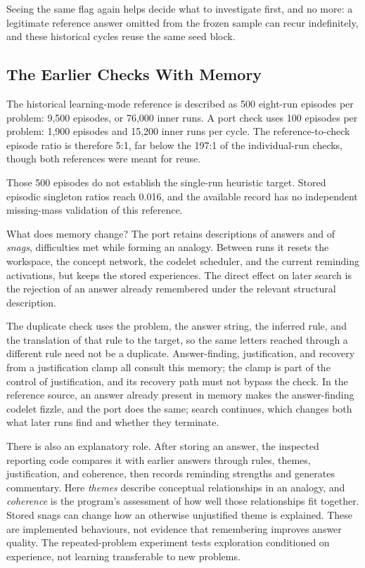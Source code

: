 \documentclass[10pt,letterpaper]{article}
\begin{document}
Seeing the same flag again helps decide what to investigate first, and no more: a
legitimate reference answer omitted from the frozen sample can recur indefinitely, and
these historical cycles reuse the same seed block.

\subsection{The Earlier Checks With Memory}\label{sec:episodic-results}

The historical learning-mode reference is described as 500 eight-run episodes per problem:
9,500 episodes, or 76,000 inner runs. A port check uses 100 episodes per problem: 1,900
episodes and 15,200 inner runs per cycle. The reference-to-check episode ratio is
therefore 5:1, far below the 197:1 of the individual-run checks, though both references
were meant for reuse.

Those 500 episodes do not establish the single-run heuristic target. Stored episodic
singleton ratios reach 0.016, and the available record has no independent missing-mass
validation of this reference.

What does memory change? The port retains descriptions of answers and of \emph{snags},
difficulties met while forming an analogy. Between runs it resets the workspace, the
concept network, the codelet scheduler, and the current reminding activations, but keeps
the stored experiences. The direct effect on later search is the rejection of an answer
already remembered under the relevant structural description.

The duplicate check uses the problem, the answer string, the inferred rule, and the
translation of that rule to the target, so the same letters reached through a different
rule need not be a duplicate. Answer-finding, justification, and recovery from a
justification clamp all consult this memory; the clamp is part of the control of
justification, and its recovery path must not bypass the check. In the reference source,
an answer already present in memory makes the answer-finding codelet fizzle, and the port
does the same; search continues, which changes both what later runs find and whether they
terminate.

There is also an explanatory role. After storing an answer, the inspected reporting code
compares it with earlier answers through rules, themes, justification, and coherence, then
records reminding strengths and generates commentary. Here \emph{themes} describe
conceptual relationships in an analogy, and \emph{coherence} is the program's assessment
of how well those relationships fit together. Stored snags can change how an otherwise
unjustified theme is explained. These are implemented behaviours, not evidence that
remembering improves answer quality. The repeated-problem experiment tests exploration
conditioned on experience, not learning transferable to new problems.
\end{document}
